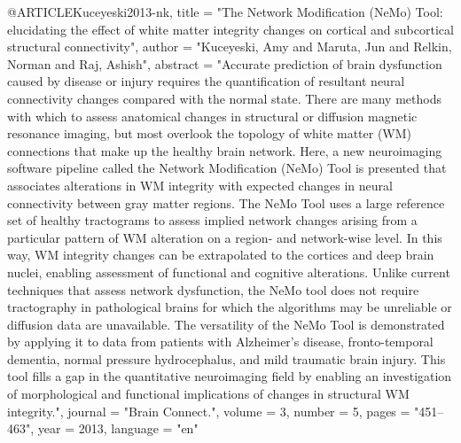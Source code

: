@ARTICLE{Kuceyeski2013-nk,
	title    = "The Network Modification ({NeMo}) Tool: elucidating the effect of
	white matter integrity changes on cortical and subcortical
	structural connectivity",
	author   = "Kuceyeski, Amy and Maruta, Jun and Relkin, Norman and Raj, Ashish",
	abstract = "Accurate prediction of brain dysfunction caused by disease or
	injury requires the quantification of resultant neural
	connectivity changes compared with the normal state. There are
	many methods with which to assess anatomical changes in
	structural or diffusion magnetic resonance imaging, but most
	overlook the topology of white matter (WM) connections that make
	up the healthy brain network. Here, a new neuroimaging software
	pipeline called the Network Modification (NeMo) Tool is presented
	that associates alterations in WM integrity with expected changes
	in neural connectivity between gray matter regions. The NeMo Tool
	uses a large reference set of healthy tractograms to assess
	implied network changes arising from a particular pattern of WM
	alteration on a region- and network-wise level. In this way, WM
	integrity changes can be extrapolated to the cortices and deep
	brain nuclei, enabling assessment of functional and cognitive
	alterations. Unlike current techniques that assess network
	dysfunction, the NeMo tool does not require tractography in
	pathological brains for which the algorithms may be unreliable or
	diffusion data are unavailable. The versatility of the NeMo Tool
	is demonstrated by applying it to data from patients with
	Alzheimer's disease, fronto-temporal dementia, normal pressure
	hydrocephalus, and mild traumatic brain injury. This tool fills a
	gap in the quantitative neuroimaging field by enabling an
	investigation of morphological and functional implications of
	changes in structural WM integrity.",
	journal  = "Brain Connect.",
	volume   =  3,
	number   =  5,
	pages    = "451--463",
	year     =  2013,
	language = "en"
}

